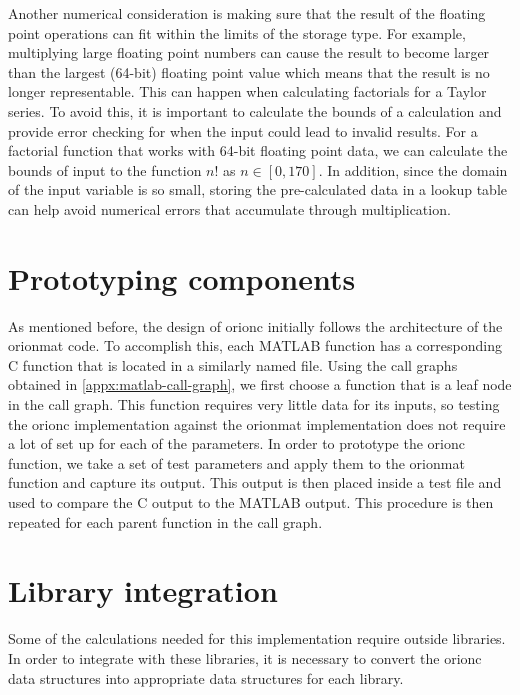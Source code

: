Another numerical consideration is making sure that the result of the floating
point operations can fit within the limits of the storage type. For example,
multiplying large floating point numbers can cause the result to become larger
than the largest  (64-bit) floating point value which
means that the result is no longer representable. This can happen when
calculating factorials for a Taylor series. To avoid this, it is important to
calculate the bounds of a calculation and provide error checking for when the
input could lead to invalid results. For a factorial function that works with
64-bit floating point data, we can calculate the bounds of input to the
function \(n!\) as \(n \in [ 0, 170 ]\). In addition, since the domain of the
input variable is so small, storing the pre-calculated data in a lookup table
can help avoid numerical errors that accumulate through multiplication.


\section{Prototyping components}

As mentioned before, the design of \gls{orionc} initially follows the
architecture of the \gls{orionmat} code. To accomplish this, each MATLAB
function has a corresponding C function that is located in a similarly named
file. Using the call graphs obtained in \cref{appx:matlab-call-graph}, we first
choose a function that is a leaf node in the call graph. This function requires
very little data for its inputs, so testing the \gls{orionc} implementation
against the \gls{orionmat} implementation does not require a lot of set up for
each of the parameters. In order to prototype the \gls{orionc} function,
we take a set of test parameters and apply them to the \gls{orionmat} function
and capture its output. This output is then placed inside a test file and used
to compare the C output to the MATLAB output. This procedure is then repeated
for each parent function in the call graph.

\section{Library integration}

Some of the calculations needed for this implementation require outside
libraries. In order to integrate with these libraries, it is necessary to
convert the \gls{orionc} data structures into appropriate data structures for each library.


